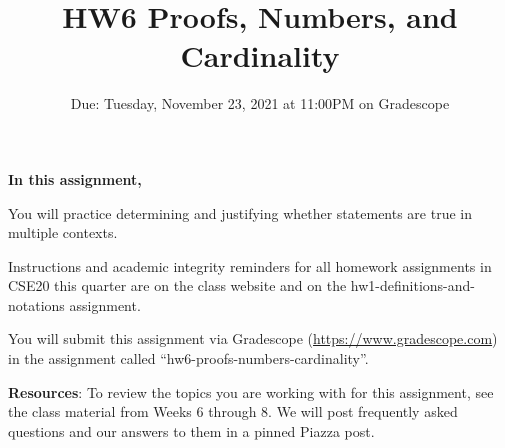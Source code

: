 

\title{HW6 Proofs, Numbers, and Cardinality}
\date{Due: Tuesday, November 23, 2021 at 11:00PM on Gradescope}


\maketitle
\thispagestyle{fancy}

{\bf In this assignment,}

You will practice determining and justifying whether 
statements are true in multiple contexts.

Instructions and academic integrity reminders for all homework assignments in 
CSE20 this quarter are on the class website and on the hw1-definitions-and-notations
assignment.

You will submit this assignment via Gradescope
(\href{https://www.gradescope.com}{https://www.gradescope.com}) 
in the assignment called ``hw6-proofs-numbers-cardinality''.

{\bf Resources}: To review the topics you are working with 
for this assignment, see the class material from Weeks 6 through 8.
We will post frequently asked questions and our answers to them in a 
pinned Piazza post.


